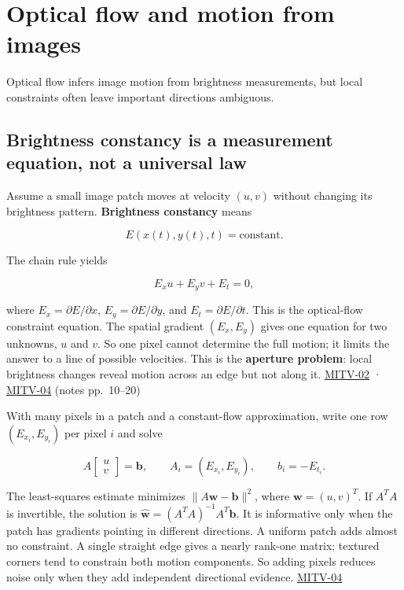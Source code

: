 \section{Optical flow and motion from images}\label{04-visual-computing-ii-ch030-optical-flow-and-motion-from-images}

Optical flow infers image motion from brightness measurements, but local constraints often leave important directions ambiguous.

\subsection{Brightness constancy is a measurement equation, not a universal law}\label{04-visual-computing-ii-ch030-brightness-constancy-is-a-measurement-equation-not-a-universal-law}

Assume a small image patch moves at velocity \((u,v)\) without changing its brightness pattern. \textbf{Brightness constancy} means

\[
E(x(t),y(t),t)=\text{constant}.
\]

The chain rule yields

\[
E_xu+E_yv+E_t=0,
\]

where \(E_x=\partial E/\partial x\), \(E_y=\partial E/\partial y\), and \(E_t=\partial E/\partial t\). This is the optical-flow constraint equation. The spatial gradient \((E_x,E_y)\) gives one equation for two unknowns, \(u\) and \(v\). So one pixel cannot determine the full motion; it limits the answer to a line of possible velocities. This is the \textbf{aperture problem}: local brightness changes reveal motion across an edge but not along it. \hyperref[04-visual-computing-ii-ch036-mitv-02---image-formation-perspective-projection-time-derivative-motion-field]{MITV-02} · \hyperref[04-visual-computing-ii-ch036-mitv-04---fixed-optical-flow-optical-mouse-constant-brightness-assumption-closed-form-solution]{MITV-04} (notes pp.~10--20)

With many pixels in a patch and a constant-flow approximation, write one row \((E_{x_i},E_{y_i})\) per pixel \(i\) and solve

\[
A\begin{bmatrix}u\\v\end{bmatrix}=\mathbf{b},\qquad A_i=(E_{x_i},E_{y_i}),\qquad b_i=-E_{t_i}.
\]

The least-squares estimate minimizes \(\|A\mathbf{w}-\mathbf{b}\|^2\), where \(\mathbf{w}=(u,v)^T\). If \(A^TA\) is invertible, the solution is \(\hat{\mathbf{w}}=(A^TA)^{-1}A^T\mathbf{b}\). It is informative only when the patch has gradients pointing in different directions. A uniform patch adds almost no constraint. A single straight edge gives a nearly rank-one matrix; textured corners tend to constrain both motion components. So adding pixels reduces noise only when they add independent directional evidence. \hyperref[04-visual-computing-ii-ch036-mitv-04---fixed-optical-flow-optical-mouse-constant-brightness-assumption-closed-form-solution]{MITV-04}

